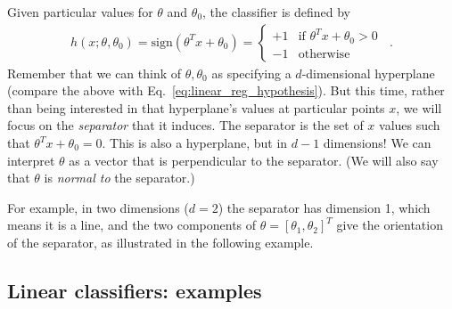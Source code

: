 Given particular values for $\theta$ and $\theta_0$, the classifier is
defined by
\begin{eqnarray*}
  h(x; \theta, \theta_0) = \text{sign}(\theta^T x + \theta_0)
  = \begin{cases} +1 & \text{if $\theta^Tx + \theta_0 > 0$} \\ -1 &
              \text{otherwise}\end{cases} \;\;.
\end{eqnarray*}
Remember that we can think of $\theta, \theta_0$ as specifying a
$d$-dimensional hyperplane (compare the above with
Eq.~\ref{eq:linear_reg_hypothesis}).  But this time, rather than
being interested in that hyperplane's values at particular points $x$,
we will focus on the {\em separator} that it induces.  The separator
is the set of $x$ values such that $\theta^T x + \theta_0 = 0$.  This
is also a hyperplane, but in $d-1$ dimensions!
We can interpret $\theta$ as a
vector that is perpendicular to the separator.  (We will also say
that $\theta$ is {\em normal to} the separator.)

For example, in two dimensions ($d=2$) the separator has dimension 1,
which means it is a line, and
the two components of $\theta = [\theta_1, \theta_2]^T$ give the orientation
of the separator, as illustrated in the following example.

\subsection{Linear classifiers: examples}


